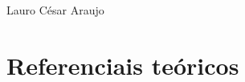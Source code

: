 \documentclass[
	12pt,				%
	openright,			%
	twoside,			%
	a4paper,			%
	english,			%
	french,				%
	spanish,			%
	brazil				%
	]{abntex2}
\begin{document}
Lauro César Araujo




\part{Referenciais teóricos}







\end{document}
